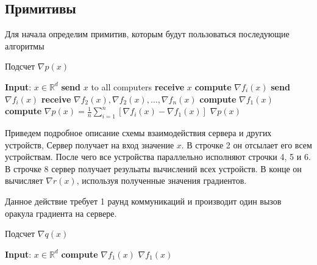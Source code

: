 \documentclass[a4paper,12pt]{extarticle}
\begin{document}
\subsection{Примитивы}
Для начала определим примитив, которым будут пользоваться последующие алгоритмы

    \begin{algorithm}[]
    \caption{Подсчет $\nabla p(x)$}
    \begin{algorithmic}[1]
    
    \STATE{} \textbf{Input}: $x \in \mathbb{R}^d$
    \STATE{} \textbf{send} $x$ to all computers 
    \vspace{0.5ex}
    \vspace{0.5ex}
    \vspace{0.5ex}
    \STATE{} \textbf{receive} $x$
    \vspace{0.5ex}
    \STATE{} \textbf{compute} $\nabla f_i(x)$
    \vspace{0.5ex}
    \STATE{} \textbf{send} $\nabla f_i(x)$
    \vspace{0.5ex}
    \ENDFOR{}
    \vspace{0.5ex}
    \STATE{} \textbf{receive} $\nabla f_2(x), \nabla f_2(x), \ldots, \nabla f_n(x)$
    \STATE{} \textbf{compute} $\nabla f_1(x)$
    \STATE{} \textbf{compute} $\nabla p(x) = \frac1n \sum_{i = 1}^{n} \left[\nabla f_i(x)  - \nabla f_1(x) \right]$
    \vspace{0.5ex}
    \RETURN{} $\nabla p(x)$
    \end{algorithmic}
    \end{algorithm}

    Приведем подробное описание схемы взаимодействия сервера и других устройств,
    Сервер получает на вход значение $x$. В строчке 2 он отсылает его всем устройствам. 
    После чего все устройства параллельно исполняют строчки 4, 5 и 6.
    В строчке 8 сервер получает резульаты вычислений всех устройств. 
    В конце он вычисляет $\nabla r(x)$, используя полученные значения градиентов. 


    Данное действие требует 1 раунд коммуникаций и производит один вызов оракула градиента на сервере. 


    \begin{algorithm}[]
    \caption{Подсчет $\nabla q(x)$}
    \begin{algorithmic}[1]
    \STATE{} \textbf{Input}: $x \in \mathbb{R}^d$
    \STATE{} \textbf{compute} $\nabla f_1(x)$
    \RETURN{} $\nabla f_1(x)$
    \end{algorithmic}
    \end{algorithm}
\end{document}
